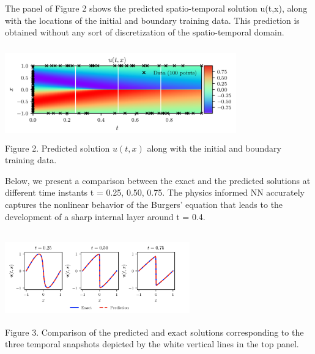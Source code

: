 \documentclass{beamer}
\begin{document}
\begin{frame}

The panel of Figure 2 shows the predicted spatio-temporal solution u(t,x), along with the locations of the initial and boundary training data. This prediction is obtained without any sort of discretization of the spatio-temporal domain. 

\begin{center}
\includegraphics[width = 10cm , height = 4cm]{02-presentation-v1/images/predicted_sol_burgers.png}
\\
\caption{Figure 2. Predicted solution $u(t,x)$ along with the initial and boundary training data.}
\end{center}

\end{frame}

\begin{frame}

Below, we present a comparison between the exact and the predicted solutions at different time instants t = 0.25, 0.50, 0.75. The physics informed NN accurately captures the nonlinear behavior of the Burgers' equation that leads to the development of a sharp internal layer around t = 0.4.
    
\begin{center}
\includegraphics[width = 8cm , height = 4cm]{02-presentation-v1/images/exact_pred_burgers.png}
\\
\caption{Figure 3. Comparison of the predicted and exact solutions corresponding to the three temporal snapshots depicted by the white vertical lines in the top panel.}
\end{center}

\end{frame}
\end{document}
